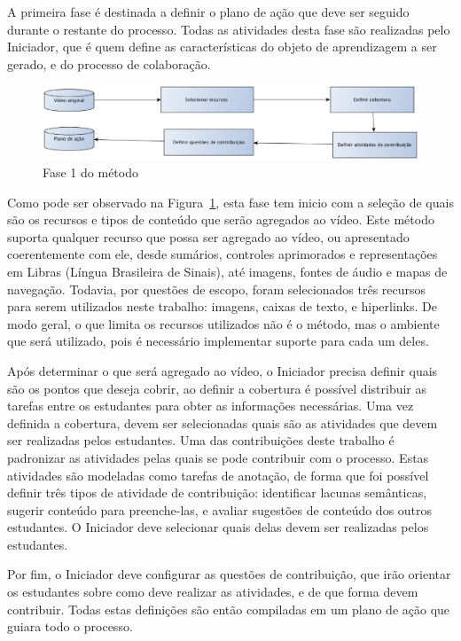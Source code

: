 A primeira fase é destinada a definir o plano de ação que deve ser seguido durante o restante do processo. Todas as atividades desta fase são realizadas pelo Iniciador, que é quem define as características do objeto de aprendizagem a ser gerado, e do processo de colaboração.

\begin{figure}[ht]
\centering
\includegraphics[width=.99\textwidth]{imagens/metodo/fase1_oa.eps}
\caption{Fase 1 do método}
\label{fig:metodo:fase1}
\end{figure}

Como pode ser observado na Figura~\ref{fig:metodo:fase1}, esta fase tem inicio com a seleção de quais são os recursos e tipos de conteúdo que serão agregados ao vídeo. Este método suporta qualquer recurso que possa ser agregado ao vídeo, ou apresentado coerentemente com ele, desde sumários, controles aprimorados e representações em Libras (Língua Brasileira de Sinais), até imagens, fontes de áudio e mapas de navegação. Todavia, por questões de escopo, foram selecionados três recursos para serem utilizados neste trabalho: imagens, caixas de texto, e hiperlinks. De modo geral, o que limita os recursos utilizados não é o método, mas o ambiente que será utilizado, pois é necessário implementar suporte para cada um deles.

Após determinar o que será agregado ao vídeo, o Iniciador precisa definir quais são os pontos que deseja cobrir, ao definir a cobertura é possível distribuir as tarefas entre os estudantes para obter as informações necessárias. Uma vez definida a cobertura, devem ser selecionadas quais são as atividades que devem ser realizadas pelos estudantes. Uma das contribuições deste trabalho é padronizar as atividades pelas quais se pode contribuir com o processo. Estas atividades são modeladas como tarefas de anotação, de forma que foi possível definir três tipos de atividade de contribuição: identificar lacunas semânticas, sugerir conteúdo para preenche-las, e avaliar sugestões de conteúdo dos outros estudantes. O Iniciador deve selecionar quais delas devem ser realizadas pelos estudantes. 

Por fim, o Iniciador deve configurar as questões de contribuição, que irão orientar os estudantes sobre como deve realizar as atividades, e de que forma devem contribuir. Todas estas definições são então compiladas em um plano de ação que guiara todo o processo.







